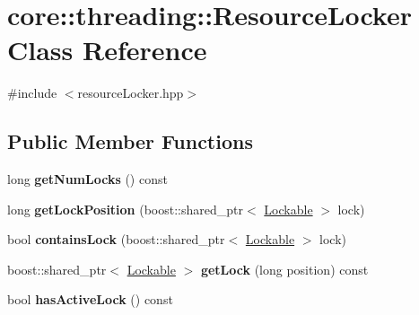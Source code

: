 \hypertarget{classcore_1_1threading_1_1_resource_locker}{\section{core\-:\-:threading\-:\-:Resource\-Locker Class Reference}
\label{classcore_1_1threading_1_1_resource_locker}
}


{\ttfamily \#include $<$resource\-Locker.\-hpp$>$}

\subsection*{Public Member Functions}
\begin{DoxyCompactItemize}
\item 
\hypertarget{classcore_1_1threading_1_1_resource_locker_a05521e49024dec23a87f74b055f7dcf8}{long {\bfseries get\-Num\-Locks} () const }\label{classcore_1_1threading_1_1_resource_locker_a05521e49024dec23a87f74b055f7dcf8}

\item 
\hypertarget{classcore_1_1threading_1_1_resource_locker_a4bd3613bea4f088813c529874adb976f}{long {\bfseries get\-Lock\-Position} (boost\-::shared\-\_\-ptr$<$ \hyperlink{classcore_1_1threading_1_1_lockable}{Lockable} $>$ lock)}\label{classcore_1_1threading_1_1_resource_locker_a4bd3613bea4f088813c529874adb976f}

\item 
\hypertarget{classcore_1_1threading_1_1_resource_locker_a2281c2e9f44ba1c29463782fa4483835}{bool {\bfseries contains\-Lock} (boost\-::shared\-\_\-ptr$<$ \hyperlink{classcore_1_1threading_1_1_lockable}{Lockable} $>$ lock)}\label{classcore_1_1threading_1_1_resource_locker_a2281c2e9f44ba1c29463782fa4483835}

\item 
\hypertarget{classcore_1_1threading_1_1_resource_locker_a8a45936b5991981118ed2282f2fb0ea1}{boost\-::shared\-\_\-ptr$<$ \hyperlink{classcore_1_1threading_1_1_lockable}{Lockable} $>$ {\bfseries get\-Lock} (long position) const }\label{classcore_1_1threading_1_1_resource_locker_a8a45936b5991981118ed2282f2fb0ea1}

\item 
\hypertarget{classcore_1_1threading_1_1_resource_locker_a015ffc9146ac201291ddedb3b63cfb41}{bool {\bfseries has\-Active\-Lock} () const }\label{classcore_1_1threading_1_1_resource_locker_a015ffc9146ac201291ddedb3b63cfb41}


\end{DoxyCompactItemize}

